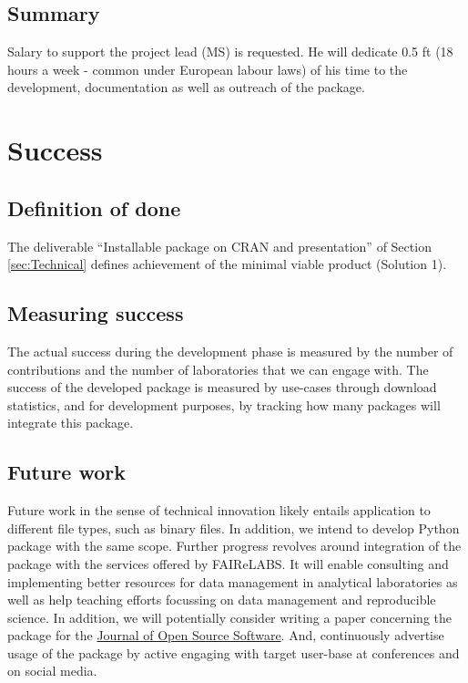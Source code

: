 \documentclass[]{article}
\begin{document}
\hypertarget{summary}{%
\subsection{Summary}\label{summary}}

Salary to support the project lead (MS) is requested. He will dedicate 0.5 ft (18 hours a week - common under European labour laws) of his time to the development, documentation as well as outreach of the package.

\hypertarget{success}{%
\section{Success}\label{success}}

\hypertarget{definition-of-done}{%
\subsection{Definition of done}\label{definition-of-done}}

The deliverable ``Installable package on CRAN and presentation'' of Section \ref{sec:Technical} defines achievement of the minimal viable product (Solution 1).

\hypertarget{measuring-success}{%
\subsection{Measuring success}\label{measuring-success}}

The actual success during the development phase is measured by the number of contributions and the number of laboratories that we can engage with. The success of the developed package is measured by use-cases through download statistics, and for development purposes, by tracking how many packages will integrate this package.

\hypertarget{future-work}{%
\subsection{Future work}\label{future-work}}

Future work in the sense of technical innovation likely entails application to different file types, such as binary files. In addition, we intend to develop Python package with the same scope. Further progress revolves around integration of the package with the services offered by FAIReLABS. It will enable consulting and implementing better resources for data management in analytical laboratories as well as help teaching efforts focussing on data management and reproducible science. In addition, we will potentially consider writing a paper concerning the package for the \href{https://joss.theoj.org/}{Journal of Open Source Software}. And, continuously advertise usage of the package by active engaging with target user-base at conferences and on social media.
\end{document}
